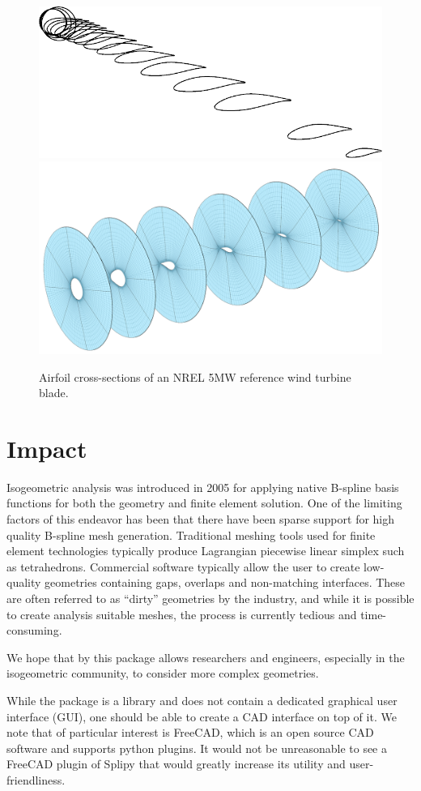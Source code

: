 \documentclass[preprint,12pt, a4paper]{elsarticle}
\begin{document}
\begin{figure}
  \begin{center}
    \includegraphics[width=.4\textwidth]{figs/airfoils}
    \includegraphics[width=.5\textwidth]{figs/crossecs2}
  \end{center}
  \caption{Airfoil cross-sections of an NREL 5MW reference wind turbine blade.}
  \label{fig:airfoils}
\end{figure}

\section{Impact}
\label{sec:impact}

Isogeometric analysis was introduced in 2005 \cite{hughes2005iac} for applying native B-spline basis functions for both the geometry and finite element solution.
One of the limiting factors of this endeavor has been that there have been sparse support for high quality B-spline mesh generation.
Traditional meshing tools used for finite element technologies typically produce Lagrangian piecewise linear simplex such as tetrahedrons.
Commercial software typically allow the user to create low-quality geometries containing gaps, overlaps and non-matching interfaces.
These are often referred to as ``dirty'' geometries by the industry, and while it is possible to create analysis suitable meshes, the process is currently tedious and time-consuming.

We hope that by this package allows researchers and engineers, especially in the isogeometric community, to consider more complex geometries.

While the package is a library and does not contain a dedicated graphical user interface (GUI), one should be able to create a CAD interface on top of it.
We note that of particular interest is FreeCAD, which is an open source CAD software and supports python plugins.
It would not be unreasonable to see a FreeCAD plugin of Splipy that would greatly increase its utility and user-friendliness.
\end{document}
